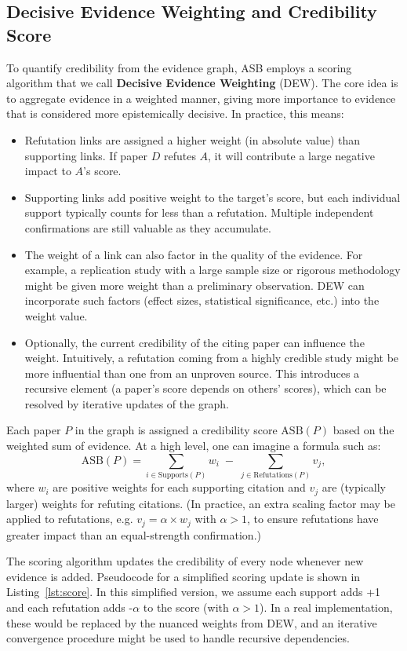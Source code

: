 \documentclass{article}
\begin{document}
\subsection{Decisive Evidence Weighting and Credibility Score}
To quantify credibility from the evidence graph, ASB employs a scoring algorithm that we call \textbf{Decisive Evidence Weighting} (DEW). The core idea is to aggregate evidence in a weighted manner, giving more importance to evidence that is considered more epistemically decisive. In practice, this means:
\begin{itemize}
    \item Refutation links are assigned a higher weight (in absolute value) than supporting links. If paper $D$ refutes $A$, it will contribute a large negative impact to $A$'s score.
    \item Supporting links add positive weight to the target's score, but each individual support typically counts for less than a refutation. Multiple independent confirmations are still valuable as they accumulate.
    \item The weight of a link can also factor in the quality of the evidence. For example, a replication study with a large sample size or rigorous methodology might be given more weight than a preliminary observation. DEW can incorporate such factors (effect sizes, statistical significance, etc.) into the weight value.
    \item Optionally, the current credibility of the citing paper can influence the weight. Intuitively, a refutation coming from a highly credible study might be more influential than one from an unproven source. This introduces a recursive element (a paper's score depends on others' scores), which can be resolved by iterative updates of the graph.
\end{itemize}

Each paper $P$ in the graph is assigned a credibility score $\text{ASB}(P)$ based on the weighted sum of evidence. At a high level, one can imagine a formula such as:
\[ 
\text{ASB}(P) = \sum_{i \in \text{Supports}(P)} w_i \;-\; \sum_{j \in \text{Refutations}(P)} v_j, 
\] 
where $w_i$ are positive weights for each supporting citation and $v_j$ are (typically larger) weights for refuting citations. (In practice, an extra scaling factor may be applied to refutations, e.g. $v_j = \alpha \times w_j$ with $\alpha > 1$, to ensure refutations have greater impact than an equal-strength confirmation.)

The scoring algorithm updates the credibility of every node whenever new evidence is added. Pseudocode for a simplified scoring update is shown in Listing~\ref{lst:score}. In this simplified version, we assume each support adds +1 and each refutation adds -$\alpha$ to the score (with $\alpha>1$). In a real implementation, these would be replaced by the nuanced weights from DEW, and an iterative convergence procedure might be used to handle recursive dependencies.
\end{document}
